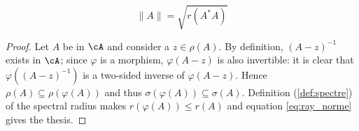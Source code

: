 \begin{proposition}
	\begin{equation}\label{eq:ray_norme}
		\|A\|=\sqrt{ r(A^*A) }
	\end{equation}
\end{proposition}

\begin{proof}
	Let $A$ be in $\cA$ and consider a $z\in\rho(A)$. By definition, $(A-z)^{-1}$ exists in $\cA$; since $\varphi$ is a morphism, $\varphi(A-z)$ is also invertible: it is clear that $\varphi( (A-z)^{-1} )$ is a two-sided inverse of $\varphi(A-z)$. Hence $\rho(A)\subseteq\rho(\varphi(A))$ and thus $\sigma(\varphi(A))\subseteq\sigma(A)$. Definition (\ref{def:spectre}) of the spectral radius makes $r(\varphi(A))\leq r(A)$ and equation \eqref{eq:ray_norme} gives the thesis.
\end{proof}


